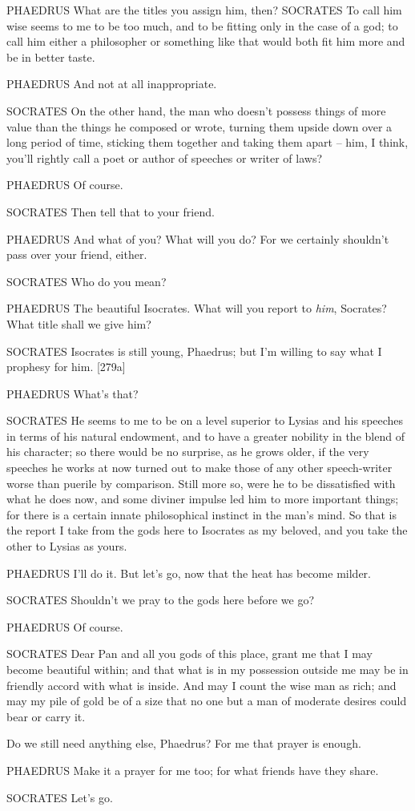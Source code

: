 PHAEDRUS What are the titles you assign him, then? SOCRATES To call him
wise seems to me to be too much, and to be fitting only in the case of a
god; to call him either a
philosopher or something
like that would both fit him more  and be in better taste.

PHAEDRUS And not at all inappropriate.

SOCRATES On the other hand, the man who doesn't possess things of more
value than the things he composed or wrote, turning them upside down
over a long period of time, sticking  them together and taking
them apart -- him, I think, you'll rightly call a poet or author of
speeches or writer of laws?

PHAEDRUS Of course.

SOCRATES Then tell that to your friend.

PHAEDRUS And what of you? What will you do? For we certainly 
shouldn't pass over your friend, either.

SOCRATES Who do you mean?

PHAEDRUS The beautiful
Isocrates. What will you
report to {\em him}, Socrates? What title shall we give him?

SOCRATES Isocrates is still young, Phaedrus; but I'm willing to
 say what I prophesy for him. {[}279a{]}

PHAEDRUS What's that?

SOCRATES He seems to me to be on a level superior to Lysias and his
speeches in terms of his natural endowment, and to have a greater
nobility in the blend of his character; so there  would be no
surprise, as he grows older, if the very speeches he works at now turned
out to make those of any other speech-writer worse than puerile by
comparison. Still more so, were he to be dissatisfied with what he does
now, and some diviner impulse led him to more important things; for
there is a certain innate philosophical instinct in the man's mind. So
that is the  report I take from the gods here to Isocrates as my
beloved, and you take the other to Lysias as yours.

 PHAEDRUS I'll do it. But let's go, now that the heat has become
milder.

SOCRATES Shouldn't we pray to the gods here before we go?

PHAEDRUS Of course.

SOCRATES Dear Pan and all you gods of this place, grant me that I may
become beautiful within; and that what is in my  possession
outside me may be in friendly accord with what is inside. And may I
count the wise man as rich; and may my pile of gold be of a size that no
one but a man of moderate
desires could bear or
carry it.

 Do we still need anything else, Phaedrus? For me that prayer is
enough.

PHAEDRUS Make it a prayer for me too; for what friends have they share.

SOCRATES Let's go.

\stoptext
